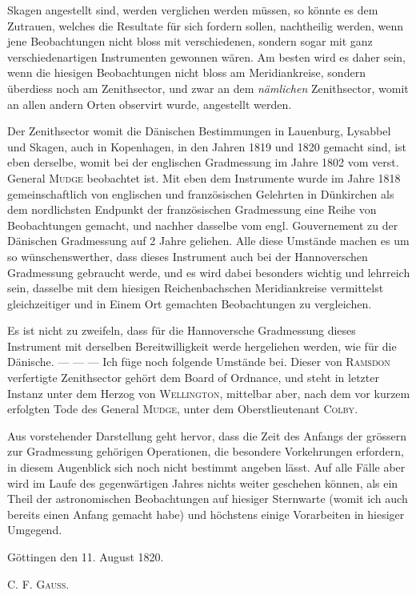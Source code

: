 %
Skagen angestellt sind, werden verglichen werden müssen, so könnte es dem Zutrauen, welches die Resultate für sich fordern sollen, nachtheilig werden, wenn jene Beobachtungen nicht bloss mit verschiedenen, sondern sogar mit ganz verschiedenartigen Instrumenten gewonnen wären. Am besten wird es daher sein, wenn die hiesigen Beobachtungen nicht bloss am Meridiankreise, sondern überdiess noch am Zenithsector, und zwar an dem \textit{nämlichen} Zenithsector, womit an allen andern Orten observirt wurde, angestellt werden.

Der Zenithsector womit die Dänischen Bestimmungen in Lauenburg, Lysabbel und Skagen, auch in Kopenhagen, in den Jahren 1819 und 1820 gemacht sind, ist eben derselbe, womit bei der englischen Gradmessung im Jahre 1802 vom verst. General \textsc{Mudge} beobachtet ist. Mit eben dem Instrumente wurde im Jahre 1818 gemeinschaftlich von englischen und französischen Gelehrten in Dünkirchen als dem nordlichsten Endpunkt der französischen Gradmessung eine Reihe von Beobachtungen gemacht, und nachher dasselbe vom engl. Gouvernement zu der Dänischen Gradmessung auf 2 Jahre geliehen. Alle diese Umstände machen es um so wünschenswerther, dass dieses Instrument auch bei der Hannoverschen Gradmessung gebraucht werde, und es wird dabei besonders wichtig und lehrreich sein, dasselbe mit dem hiesigen Reichenbachschen Meridiankreise vermittelst gleichzeitiger und in Einem Ort gemachten Beobachtungen zu vergleichen.

Es ist nicht zu zweifeln, dass für die Hannoversche Gradmessung dieses Instrument mit derselben Bereitwilligkeit werde hergeliehen werden, wie für die Dänische. — — — Ich füge noch folgende Umstände bei. Dieser von \textsc{Ramsdon} verfertigte Zenithsector gehört dem Board of Ordnance, und steht in letzter Instanz unter dem Herzog von \textsc{Wellington}, mittelbar aber, nach dem vor kurzem erfolgten Tode des General \textsc{Mudge}, unter dem Oberstlieutenant \textsc{Colby}.

Aus vorstehender Darstellung geht hervor, dass die Zeit des Anfangs der grössern zur Gradmessung gehörigen Operationen, die besondere Vorkehrungen erfordern, in diesem Augenblick sich noch nicht bestimmt angeben lässt. Auf alle Fälle aber wird im Laufe des gegenwärtigen Jahres nichts weiter geschehen können, als ein Theil der astronomischen Beobachtungen auf hiesiger Sternwarte (womit ich auch bereits einen Anfang gemacht habe) und höchstens einige Vorarbeiten in hiesiger Umgegend.

Göttingen den 11. August 1820.
\begin{flushright}C. F. \textsc{Gauss}.\end{flushright}

